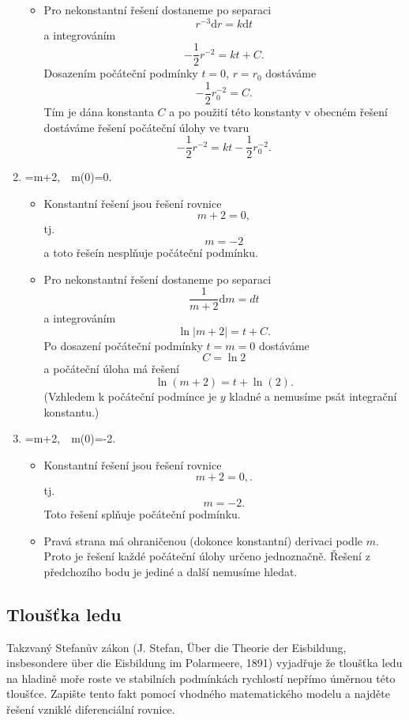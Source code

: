 \begin{enumerate}[(1)]
\begin{itemize}
  \item Pro nekonstantní řešení dostaneme po separaci  $$ r^{-3}\mathrm dr=k\mathrm dt $$ a integrováním $$ -\frac 12 r^{-2}=kt+C.$$ Dosazením počáteční podmínky $t=0$, $r=r_0$ dostáváme $$ -\frac 12 r_0^{-2}=C.$$ Tím je dána konstanta $C$ a po použití této konstanty v obecném řešení dostáváme řešení počáteční úlohy ve tvaru $$ -\frac 12 r^{-2}=kt-\frac 12 r_0^{-2}.$$
  \end{itemize}
\item \priklad {}=m+2,\ \ m(0)=0.
  \begin{itemize}
  \item Konstantní řešení jsou řešení rovnice $$ m+2=0,$$ tj. $$ m=-2$$ a toto řešeín nesplňuje počáteční podmínku.
  \item Pro nekonstantní řešení dostaneme po separaci  $$ \frac1{m+2}\mathrm dm=dt $$ a integrováním $$ \ln|m+2|=t+C.$$ Po dosazení počáteční podmínky $t=m=0$ dostáváme $$C=\ln 2$$ a počáteční úloha má řešení $$\ln(m+2)=t+\ln (2).$$ (Vzhledem k počáteční podmínce je $y$ kladné a nemusíme psát integrační konstantu.)
  \end{itemize}
\item \priklad {}=m+2,\ \ m(0)=-2.
  \begin{itemize}
  \item Konstantní řešení jsou řešení rovnice $$ m+2=0,.$$ tj. $$ m=-2.$$ Toto řešení splňuje počáteční podmínku.
  \item Pravá strana má ohraničenou (dokonce konstantní) derivaci podle $m$. Proto je řešení každé počáteční úlohy určeno jednoznačně. Řešení z předchozího bodu je jediné a další nemusíme hledat.
  \end{itemize}
\end{enumerate}

\konec

\subsection{Tloušťka ledu}

Takzvaný Stefanův zákon (J. Stefan, \"Uber die Theorie der Eisbildung, insbesondere \"uber die Eisbildung im Polarmeere, 1891) vyjadřuje že tloušťka ledu na hladině moře roste ve
stabilních podmínkách rychlostí nepřímo úměrnou této tloušťce. Zapište
tento fakt pomocí vhodného matematického modelu a najděte řešení
vzniklé diferenciální rovnice.

\reseni

